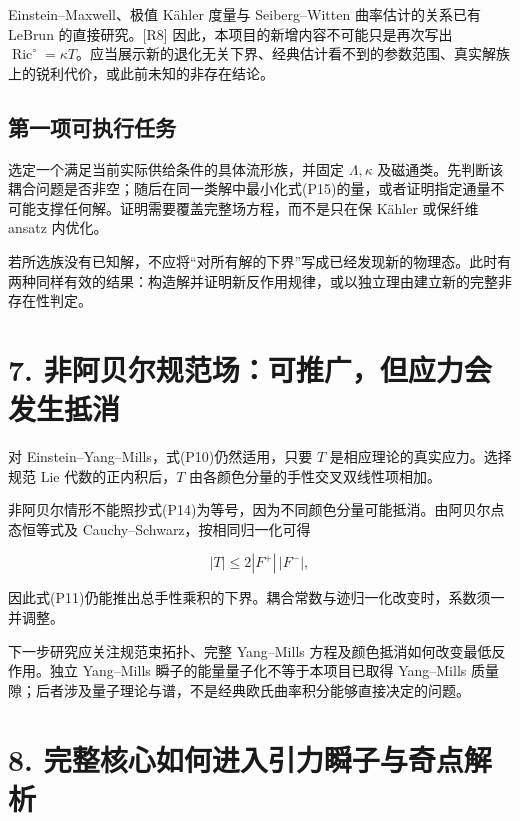 \documentclass[UTF8,a4paper,11pt,fontset=fandol]{ctexart}
\begin{document}
Einstein--Maxwell、极值 Kähler 度量与 Seiberg--Witten 曲率估计的关系已有
LeBrun 的直接研究。{[}R8{]} 因此，本项目的新增内容不可能只是再次写出
\(\operatorname{Ric}^{\circ}=\kappa T\)。应当展示新的退化无关下界、经典估计看不到的参数范围、真实解族上的锐利代价，或此前未知的非存在结论。

\subsection{第一项可执行任务}\label{ux7b2cux4e00ux9879ux53efux6267ux884cux4efbux52a1}

选定一个满足当前实际供给条件的具体流形族，并固定 \(\Lambda,\kappa\)
及磁通类。先判断该耦合问题是否非空；随后在同一类解中最小化式(P15)的量，或者证明指定通量不可能支撑任何解。证明需要覆盖完整场方程，而不是只在保
Kähler 或保纤维 ansatz 内优化。

若所选族没有已知解，不应将``对所有解的下界''写成已经发现新的物理态。此时有两种同样有效的结果：构造解并证明新反作用规律，或以独立理由建立新的完整非存在性判定。

\section{7.
非阿贝尔规范场：可推广，但应力会发生抵消}\label{ux975eux963fux8d1dux5c14ux89c4ux8303ux573aux53efux63a8ux5e7fux4f46ux5e94ux529bux4f1aux53d1ux751fux62b5ux6d88}

对 Einstein--Yang--Mills，式(P10)仍然适用，只要 \(T\)
是相应理论的真实应力。选择规范 Lie 代数的正内积后，\(T\)
由各颜色分量的手性交叉双线性项相加。

非阿贝尔情形不能照抄式(P14)为等号，因为不同颜色分量可能抵消。由阿贝尔点态恒等式及
Cauchy--Schwarz，按相同归一化可得

\[
|T|\le2|F^+|\,|F^-|,
\tag{P16}
\]

因此式(P11)仍能推出总手性乘积的下界。耦合常数与迹归一化改变时，系数须一并调整。

下一步研究应关注规范束拓扑、完整 Yang--Mills
方程及颜色抵消如何改变最低反作用。独立 Yang--Mills
瞬子的能量量子化不等于本项目已取得 Yang--Mills
质量隙；后者涉及量子理论与谱，不是经典欧氏曲率积分能够直接决定的问题。

\section{8.
完整核心如何进入引力瞬子与奇点解析}\label{ux5b8cux6574ux6838ux5fc3ux5982ux4f55ux8fdbux5165ux5f15ux529bux77acux5b50ux4e0eux5947ux70b9ux89e3ux6790}
\end{document}
